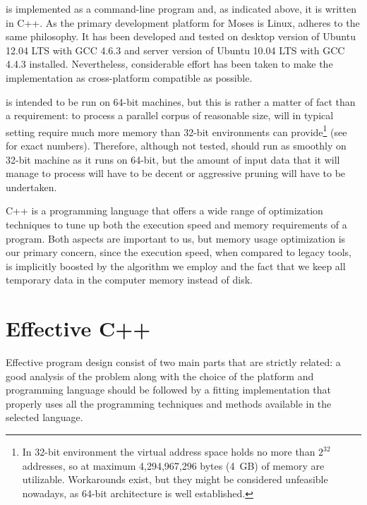 

\Eppex{} is implemented as a command-line program and, as indicated above, it is written in C++.
As the primary development platform for Moses is Linux,
\eppex{} adheres to the same philosophy.
It has been developed and tested on desktop version of Ubuntu 12.04 LTS with GCC 4.6.3
and server version of Ubuntu 10.04 LTS with GCC 4.4.3 installed. %
Nevertheless, considerable effort has been taken to make the implementation as cross-platform
compatible as possible.

\Eppex{} is intended to be run on 64-bit machines, but this is rather a matter of fact than
a requirement: to process a parallel corpus of reasonable size, \eppex{} will in typical
setting require much more memory than 32-bit environments can provide\footnote{In 32-bit
environment the virtual address space holds no more than $2^{32}$ addresses, so at maximum
4,294,967,296 bytes (4~GB) of memory are utilizable. Workarounds exist, but they might be
considered unfeasible nowadays, as 64-bit architecture is well established.} (see 
for exact numbers).
Therefore, although not tested, \eppex{} should run as smoothly on 32-bit machine as it runs
on 64-bit, but the amount of input data that it will manage to process will have to be decent
or aggressive pruning will have to be undertaken.

C++ is a programming language that offers a wide range of optimization techniques to
tune up both the execution speed and memory requirements of a program.
Both aspects are important to us, but memory usage optimization is our primary concern,
since the execution speed, when compared to legacy tools, is implicitly boosted by the algorithm
we employ and the fact that we keep all temporary data in the computer memory instead of disk.

\section{Effective C++}

Effective program design consist of two main parts that are strictly related:
a good analysis of the problem along with the choice of the platform and programming language
should be followed by a fitting implementation that properly uses all the programming techniques
and methods available in the selected language.

